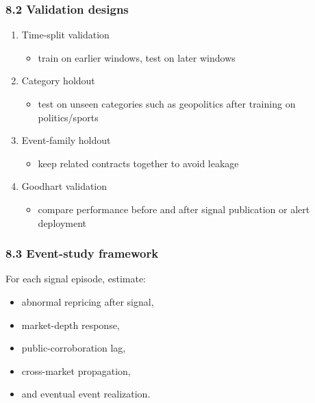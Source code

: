 \documentclass[
]{article}
\providecommand{\tightlist}{%
  \setlength{\itemsep}{0pt}\setlength{\parskip}{0pt}}
\begin{document}
\subsubsection{8.2 Validation designs}\label{82-validation-designs}

\begin{enumerate}
\def\labelenumi{\arabic{enumi}.}
\item
  Time-split validation

  \begin{itemize}
  \tightlist
  \item
    train on earlier windows, test on later windows
  \end{itemize}
\item
  Category holdout

  \begin{itemize}
  \tightlist
  \item
    test on unseen categories such as geopolitics after training on
    politics/sports
  \end{itemize}
\item
  Event-family holdout

  \begin{itemize}
  \tightlist
  \item
    keep related contracts together to avoid leakage
  \end{itemize}
\item
  Goodhart validation

  \begin{itemize}
  \tightlist
  \item
    compare performance before and after signal publication or alert
    deployment
  \end{itemize}
\end{enumerate}

\subsubsection{8.3 Event-study
framework}\label{83-event-study-framework}

For each signal episode, estimate:

\begin{itemize}
\tightlist
\item
  abnormal repricing after signal,
\item
  market-depth response,
\item
  public-corroboration lag,
\item
  cross-market propagation,
\item
  and eventual event realization.
\end{itemize}
\end{document}
